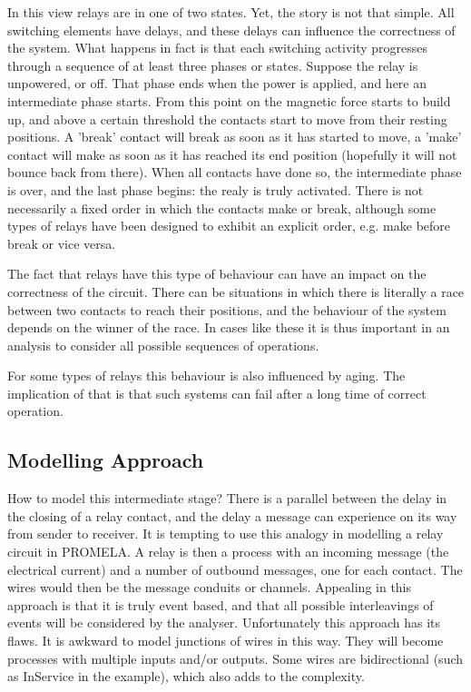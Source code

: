 In this view relays are in one of two states.
Yet, the story is not that simple. All switching elements have delays, and these delays can
influence the correctness of the system.
What happens in fact is that  each switching activity progresses through a sequence of
 at least three phases or states.
Suppose the
relay is unpowered, or off. That phase ends when the power is applied, and here an
intermediate phase starts. From this point on the
magnetic force starts to build up, and above a certain threshold the contacts start to move
from their resting positions.
A 'break' contact will break as soon as it has started to move,
a 'make' contact will make as soon as it has reached its end position (hopefully it will not
bounce back from there).
When all contacts have done so, the intermediate phase is over, and the last phase begins: the realy is truly activated.
There is not necessarily a fixed order in which the contacts make or break, although some
types of relays have been designed to exhibit an explicit order, e.g. make before break or
vice versa.

The fact that relays have this type of
behaviour can have an impact on the correctness of the circuit.
There can be situations in which there is literally a race between two contacts to reach their
positions, and the behaviour of the system depends on the winner of the race.
In cases like these it is thus important in an analysis to consider all possible sequences of operations.

For some types of relays this behaviour is also influenced by aging.
The implication of that is that such systems can fail after a long time of correct operation.

\subsection{Modelling Approach}

How to model this intermediate stage? 
There is a parallel between the delay in the closing of a relay contact, and the delay
a message can experience on its way from sender to receiver.
It is tempting to use this analogy in modelling a relay circuit in PROMELA. A relay is then a
process with an incoming message (the electrical current) and a number of outbound messages, one for each
contact. The wires would then be the message conduits or channels.
Appealing in this approach is that it is truly event based, and that all possible
interleavings of events will be considered by the analyser.
Unfortunately this approach has its flaws.
It is awkward to model junctions of wires in this
way. They will become processes with multiple inputs and/or outputs.
Some wires are 
bidirectional (such as InService in the example), which also adds to the complexity.

